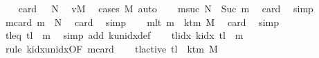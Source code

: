 \begin{isabellebody}
\ \ \isamarkupfalse%
\ card{}{\isacharcolon}{\kern0pt}\ {\isachardoublequoteopen}{}\ {\isacharless}{\kern0pt}\ {\isacharquery}{\kern0pt}N{\isachardoublequoteclose}\ \isamarkupfalse%
\ vM\ \isamarkupfalse%
\ {\isacharparenleft}{\kern0pt}cases\ M{\isacharparenright}{\kern0pt}\ auto\isanewline
\ \ \isamarkupfalse%
\ m{}suc{\isacharcolon}{\kern0pt}\ {\isachardoublequoteopen}{\isacharquery}{\kern0pt}N\ {\isacharequal}{\kern0pt}\ Suc\ {\isacharquery}{\kern0pt}m{}{\isachardoublequoteclose}\ \isamarkupfalse%
\ card{}\ \isamarkupfalse%
\ simp\isanewline
\ \ \isamarkupfalse%
\ m{}card{\isacharcolon}{\kern0pt}\ {\isachardoublequoteopen}{\isacharquery}{\kern0pt}m{}\ {\isacharless}{\kern0pt}\ {\isacharquery}{\kern0pt}N{\isachardoublequoteclose}\ \isamarkupfalse%
\ card{}\ \isamarkupfalse%
\ simp\isanewline
\ \ \isamarkupfalse%
\ m{}lt{\isacharcolon}{\kern0pt}\ {\isachardoublequoteopen}{\isacharquery}{\kern0pt}m{}\ {\isacharless}{\kern0pt}\ k{\isacharunderscore}{\kern0pt}tm\ M{\isachardoublequoteclose}\ \isamarkupfalse%
\ card{}\ \isamarkupfalse%
\ simp\isanewline
\ \ \isamarkupfalse%
\ tl{\isacharunderscore}{\kern0pt}eq{\isacharcolon}{\kern0pt}\ {\isachardoublequoteopen}{\isacharquery}{\kern0pt}tl\ {\isacharequal}{\kern0pt}\ {\isacharquery}{\kern0pt}m{}{\isachardoublequoteclose}\ \isamarkupfalse%
\ {\isacharparenleft}{\kern0pt}simp\ add{\isacharcolon}{\kern0pt}\ k{\isacharunderscore}{\kern0pt}unidx{\isacharunderscore}{\kern0pt}def{\isacharparenright}{\kern0pt}\isanewline
\ \ \isamarkupfalse%
\ tlidx{\isacharcolon}{\kern0pt}\ {\isachardoublequoteopen}k{\isacharunderscore}{\kern0pt}idx\ {\isacharquery}{\kern0pt}tl\ {\isacharequal}{\kern0pt}\ {\isacharquery}{\kern0pt}m{}{\isachardoublequoteclose}\ \isamarkupfalse%
\ {\isacharparenleft}{\kern0pt}rule\ k{\isacharunderscore}{\kern0pt}idx{\isacharunderscore}{\kern0pt}unidx{\isacharbrackleft}{\kern0pt}OF\ m{}card{\isacharbrackright}{\kern0pt}{\isacharparenright}{\kern0pt}\isanewline
\ \ \isamarkupfalse%
\ tl{\isacharunderscore}{\kern0pt}active{\isacharcolon}{\kern0pt}\ {\isachardoublequoteopen}{\isacharquery}{\kern0pt}tl\ {\isacharless}{\kern0pt}\ k{\isacharunderscore}{\kern0pt}tm\ M{\isachardoublequoteclose}\ \isamarkupfalse%

\end{isabellebody}
